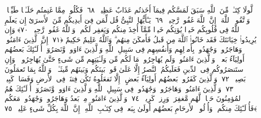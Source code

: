  لَّولَا كِتَـٰبٌۭ مِّنَ ٱللَّهِ سَبَقَ لَمَسَّكُم فِيمَآ أَخَذتُم عَذَابٌ عَظِيمٌۭ ﴿٦٨﴾
 فَكُلُوا۟ مِمَّا غَنِمتُم حَلَـٰلًۭا طَيِّبًۭا ۚ وَٱتَّقُوا۟ ٱللَّهَ ۚ إِنَّ ٱللَّهَ غَفُورٌۭ رَّحِيمٌۭ ﴿٦٩﴾
 يَـٰٓأَيُّهَا ٱلنَّبِىُّ قُل لِّمَن فِىٓ أَيدِيكُم مِّنَ ٱلأَسرَىٰٓ إِن يَعلَمِ ٱللَّهُ فِى قُلُوبِكُم خَيرًۭا يُؤتِكُم خَيرًۭا مِّمَّآ أُخِذَ مِنكُم وَيَغفِر لَكُم ۗ وَٱللَّهُ غَفُورٌۭ رَّحِيمٌۭ ﴿٧٠﴾
 وَإِن يُرِيدُوا۟ خِيَانَتَكَ فَقَد خَانُوا۟ ٱللَّهَ مِن قَبلُ فَأَمكَنَ مِنهُم ۗ وَٱللَّهُ عَلِيمٌ حَكِيمٌ ﴿٧١﴾
 إِنَّ ٱلَّذِينَ ءَامَنُوا۟ وَهَاجَرُوا۟ وَجَٰهَدُوا۟ بِأَموَٟلِهِم وَأَنفُسِهِم فِى سَبِيلِ ٱللَّهِ وَٱلَّذِينَ ءَاوَوا۟ وَّنَصَرُوٓا۟ أُو۟لَـٰٓئِكَ بَعضُهُم أَولِيَآءُ بَعضٍۢ ۚ وَٱلَّذِينَ ءَامَنُوا۟ وَلَم يُهَاجِرُوا۟ مَا لَكُم مِّن وَلَـٰيَتِهِم مِّن شَىءٍ حَتَّىٰ يُهَاجِرُوا۟ ۚ وَإِنِ ٱستَنصَرُوكُم فِى ٱلدِّينِ فَعَلَيكُمُ ٱلنَّصرُ إِلَّا عَلَىٰ قَومٍۭ بَينَكُم وَبَينَهُم مِّيثَـٰقٌۭ ۗ وَٱللَّهُ بِمَا تَعمَلُونَ بَصِيرٌۭ ﴿٧٢﴾
 وَٱلَّذِينَ كَفَرُوا۟ بَعضُهُم أَولِيَآءُ بَعضٍ ۚ إِلَّا تَفعَلُوهُ تَكُن فِتنَةٌۭ فِى ٱلأَرضِ وَفَسَادٌۭ كَبِيرٌۭ ﴿٧٣﴾
 وَٱلَّذِينَ ءَامَنُوا۟ وَهَاجَرُوا۟ وَجَٰهَدُوا۟ فِى سَبِيلِ ٱللَّهِ وَٱلَّذِينَ ءَاوَوا۟ وَّنَصَرُوٓا۟ أُو۟لَـٰٓئِكَ هُمُ ٱلمُؤمِنُونَ حَقًّۭا ۚ لَّهُم مَّغفِرَةٌۭ وَرِزقٌۭ كَرِيمٌۭ ﴿٧٤﴾
 وَٱلَّذِينَ ءَامَنُوا۟ مِنۢ بَعدُ وَهَاجَرُوا۟ وَجَٰهَدُوا۟ مَعَكُم فَأُو۟لَـٰٓئِكَ مِنكُم ۚ وَأُو۟لُوا۟ ٱلأَرحَامِ بَعضُهُم أَولَىٰ بِبَعضٍۢ فِى كِتَـٰبِ ٱللَّهِ ۗ إِنَّ ٱللَّهَ بِكُلِّ شَىءٍ عَلِيمٌۢ ﴿٧٥﴾
 
